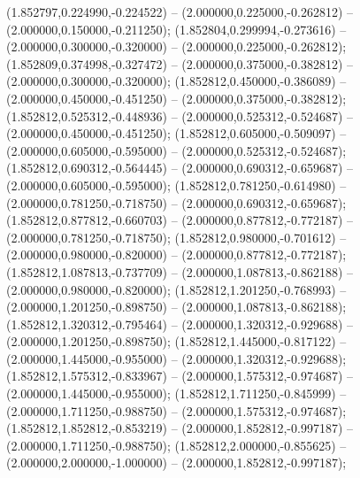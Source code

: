  (1.852797,0.224990,-0.224522) -- (2.000000,0.225000,-0.262812) -- (2.000000,0.150000,-0.211250);
 (1.852804,0.299994,-0.273616) -- (2.000000,0.300000,-0.320000) -- (2.000000,0.225000,-0.262812);
 (1.852809,0.374998,-0.327472) -- (2.000000,0.375000,-0.382812) -- (2.000000,0.300000,-0.320000);
 (1.852812,0.450000,-0.386089) -- (2.000000,0.450000,-0.451250) -- (2.000000,0.375000,-0.382812);
 (1.852812,0.525312,-0.448936) -- (2.000000,0.525312,-0.524687) -- (2.000000,0.450000,-0.451250);
 (1.852812,0.605000,-0.509097) -- (2.000000,0.605000,-0.595000) -- (2.000000,0.525312,-0.524687);
 (1.852812,0.690312,-0.564445) -- (2.000000,0.690312,-0.659687) -- (2.000000,0.605000,-0.595000);
 (1.852812,0.781250,-0.614980) -- (2.000000,0.781250,-0.718750) -- (2.000000,0.690312,-0.659687);
 (1.852812,0.877812,-0.660703) -- (2.000000,0.877812,-0.772187) -- (2.000000,0.781250,-0.718750);
 (1.852812,0.980000,-0.701612) -- (2.000000,0.980000,-0.820000) -- (2.000000,0.877812,-0.772187);
 (1.852812,1.087813,-0.737709) -- (2.000000,1.087813,-0.862188) -- (2.000000,0.980000,-0.820000);
 (1.852812,1.201250,-0.768993) -- (2.000000,1.201250,-0.898750) -- (2.000000,1.087813,-0.862188);
 (1.852812,1.320312,-0.795464) -- (2.000000,1.320312,-0.929688) -- (2.000000,1.201250,-0.898750);
 (1.852812,1.445000,-0.817122) -- (2.000000,1.445000,-0.955000) -- (2.000000,1.320312,-0.929688);
 (1.852812,1.575312,-0.833967) -- (2.000000,1.575312,-0.974687) -- (2.000000,1.445000,-0.955000);
 (1.852812,1.711250,-0.845999) -- (2.000000,1.711250,-0.988750) -- (2.000000,1.575312,-0.974687);
 (1.852812,1.852812,-0.853219) -- (2.000000,1.852812,-0.997187) -- (2.000000,1.711250,-0.988750);
 (1.852812,2.000000,-0.855625) -- (2.000000,2.000000,-1.000000) -- (2.000000,1.852812,-0.997187);

